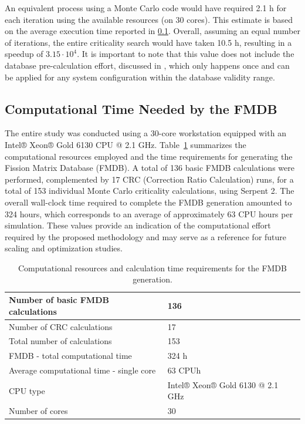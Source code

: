 \documentclass[preprint,review,12pt]{elsarticle}
\begin{document}
An equivalent process using a Monte Carlo code would have required 2.1 h for each iteration using the available resources (on 30 cores). This estimate is based on the average execution time reported in \cref{subsec:Computational time needed for the FMDB}. Overall, assuming an equal number of iterations, the entire criticality search would have taken 10.5 h, resulting in a speedup of $3.15 \cdot 10^4$. It is important to note that this value does not include the database pre-calculation effort, discussed in , which only happens once and can be applied for any system configuration within the database validity range.

\subsection{Computational Time Needed by the FMDB}
\label{subsec:Computational time needed for the FMDB}

The entire study was conducted using a 30-core workstation equipped with an Intel® Xeon® Gold 6130 CPU @ 2.1 GHz.  
Table~\cref{tab:FMDBresources} summarizes the computational resources employed and the time requirements for generating the Fission Matrix Database (FMDB).  
A total of 136 basic FMDB calculations were performed, complemented by 17 CRC (Correction Ratio Calculation) runs, for a total of 153 individual Monte Carlo criticality calculations, using Serpent 2.  
The overall wall-clock time required to complete the FMDB generation amounted to 324 hours, which corresponds to an average of approximately 63 CPU hours per simulation.  
These values provide an indication of the computational effort required by the proposed methodology and may serve as a reference for future scaling and optimization studies.

\begin{table}[h!]
\centering
\FloatBarrier
\caption{Computational resources and calculation time requirements for the FMDB generation.}
\label{tab:FMDBresources}
\begin{tabular}{ll}
\hline
Number of basic FMDB calculations       & 136                                      \\ \hline
Number of CRC calculations              & 17                                       \\ \hline
Total number of calculations            & 153                                      \\ \hline
FMDB - total computational time         & 324 h                                    \\ \hline
Average computational time - single core & 63 CPUh                                  \\ \hline
CPU type                                & Intel® Xeon® Gold 6130 @ 2.1 GHz          \\ \hline
Number of cores                         & 30                                       \\ \hline
\end{tabular}
\end{table}
\end{document}

